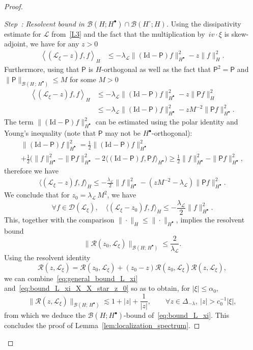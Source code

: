 \documentclass[10pt]{amsart}
\theoremstyle{definition}\newtheorem{defi}[theo]{Definition}\newtheorem{rema}[theo]{Remark}\newtheorem{exam}[theo]{Example}\newtheorem{exem}[theo]{Example}\newtheorem{nota}[theo]{Notation}
\newcommand{\Id}{\mathrm{Id}}
\newcommand{\LL}{\mathcal{L}}
\newcommand{\PP}{\mathsf{P}}
\newcommand{\RR}{\mathcal{R}}
\newcommand{\dom}{\mathscr{D}}
\newcommand{\BBB}{\mathscr{B}}
\newcommand{\Ss}{H}
\newcommand{\Ssp}{H^{\bullet}}
\newcommand{\Ssm}{H^{\circ}}
\renewcommand*\le{\leqslant}
\renewcommand*\ge{\geqslant}
\renewcommand*\leq{\leqslant}
\newcommand{\la}{\langle}
\newcommand{\ra}{\rangle}
\newcommand{\lla}{\left\langle}
\newcommand{\rra}{\right\rangle}
\newcounter{stepcount}
\newenvironment{step}[1]{\refstepcounter{stepcount}\begin{proof}[Step~\thestepcount: #1]}{\let\qed\relax\end{proof}}
\let\oldforall\forall
\renewcommand*{\forall}{\mathrel{\oldforall}}
\begin{document}
\begin{proof}
\begin{step}{{Resolvent bound in $\BBB(\Ss; \Ssp) \cap \BBB(\Ssm ; \Ss)$}}
Using the dissipativity estimate for $\LL$ from~\eqref{L3} and the fact that the multiplication by~$i v \cdot \xi$ is skew-adjoint, we have for any $z > 0$
\begin{align*}
\lla (\LL_\xi - z) f, f \rra_{\Ss} & \le - \lambda_\LL \| (\Id - \PP) f \|_{\Ssp}^2 - z \| f \|^2_{\Ss}.
\end{align*}
Furthermore, using that $\PP$ is $\Ss$-orthogonal as well as the fact that $\PP^2 = \PP$ and $\| \PP \|_{\BBB(\Ss\,;\,\Ssp)} \le M$ for some $M > 0$
\begin{align*}
\lla (\LL_\xi - z) f, f \rra_{\Ss} & \le - \lambda_\LL \| (\Id - \PP) f \|_{\Ssp}^2 - z \| \PP f \|^2_{\Ss} \\
& \le - \lambda_\LL \| (\Id - \PP) f \|_{\Ssp}^2 - z {M^{-2}} \| \PP f \|^2_{\Ssp}.
\end{align*}
The term $\| (\Id - \PP) f \|_{\Ssp}^2$ can be estimated using the polar identity and Young's inequality (note that $\PP$ may not be $\Ssp$-orthogonal):
\begin{multline}\label{eq:degenerate_pythagora_X_star}
\| (\Id - \PP) f \|_{\Ssp}^2  = \frac{1}{2} \| (\Id - \PP) f \|_{\Ssp}^2\\
+ \frac{1}{2} \Big(\| f \|^2_{\Ssp} - \| \PP f \|_{\Ssp}^2 - 2 \big\la (\Id - \PP) f, \PP f \big\ra_{\Ssp}\Big)
 \ge \frac{1}{2} \| f \|^2_{\Ssp} - \| \PP f \|_{\Ssp}^2,
\end{multline}
therefore we have
\begin{align*}
\big\la (\LL_\xi - z) f, f \big\ra_{\Ss} \le - \frac{\lambda_\LL}{2} \| f \|_{\Ssp}^2 - \left(z {M^{-2}} - \lambda_\LL \right) \| \PP f \|^2_{\Ssp}.
\end{align*}
We conclude that for $z_0 = {\lambda_\LL \,M^{2}}$, we have
\[
\forall f \in \dom(\LL_{\xi}), \quad \big\la (\LL_\xi - z_0) f, f \big\ra_{\Ss} \le - \frac{\lambda_\LL}{2} \| f \|_{\Ssp}^2.
\]
This, together with the comparison $\|\cdot\|_{\Ss} \leq \|\cdot\|_{\Ssp}$, implies the resolvent bound
\begin{equation}\label{eq:bound_L_xi_X_X_star_z_0}
\| \RR(z_{0},\LL_{\xi})\|_{\BBB(\Ss ;\,\Ssp)} \le \frac{2}{\lambda_\LL}.
\end{equation}
Using the resolvent identity
\begin{equation*}
\RR(z,\LL_{\xi}) = \RR(z_{0},\LL_{\xi})+ (z_0 - z) \RR(z_{0},\LL_{\xi})\RR(z,\LL_{\xi}),
\end{equation*}
we can combine~\eqref{eq:general_bound_L_xi} and~\eqref{eq:bound_L_xi_X_X_star_z_0} so as to obtain, for $|\xi| \le \alpha_{0}$,
\begin{equation}
\| \RR(z,\LL_{\xi}) \|_{\BBB(\Ss;\,\Ssp)}
\lesssim 1 + |z| + \frac{1}{|z|}, \qquad \forall z \in \Delta_{-\lambda},~|z| > c_0^{-1}|\xi|,
\end{equation}
from which we deduce the $\BBB(\Ss;\Ssp)$-bound of~\eqref{eq:bound_L_xi}. This concludes the proof of Lemma~\ref{lem:localization_spectrum}.\qedhere
\end{step}\let\qed\relax
\end{proof}
\end{document}
